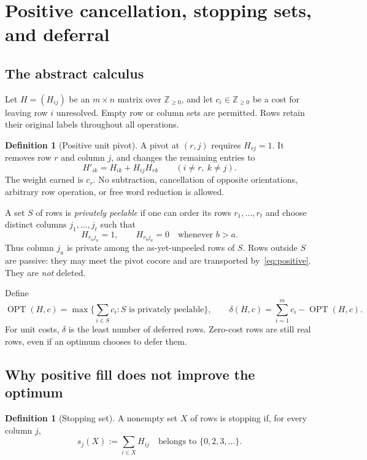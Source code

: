 \documentclass[11pt,a4paper]{article}
\theoremstyle{definition}
\newtheorem{definition}[theorem]{Definition}
\theoremstyle{remark}
\newcommand{\OPT}{\operatorname{OPT}}
\newcommand{\Z}{\mathbb Z}
\begin{document}
\section{Positive cancellation, stopping sets, and deferral}
\label{sec:positive}

\subsection{The abstract calculus}
Let $H=(H_{ij})$ be an $m\times n$ matrix over $\Z_{\geq0}$, and let
$c_i\in\Z_{\geq0}$ be a cost for leaving row $i$ unresolved. Empty row or
column sets are permitted. Rows retain their original labels throughout
all operations.

\begin{definition}[Positive unit pivot]
A pivot at $(r,j)$ requires $H_{rj}=1$. It removes row $r$ and column $j$,
and changes the remaining entries to
\begin{equation}
 H'_{ik}=H_{ik}+H_{ij}H_{rk}\qquad (i\ne r,\ k\ne j).
 \label{eq:positive}
\end{equation}
The weight earned is $c_r$. No subtraction, cancellation of opposite
orientations, arbitrary row operation, or free word reduction is allowed.
\end{definition}

A set $S$ of rows is \emph{privately peelable} if one can order its rows
$r_1,\ldots,r_t$ and choose distinct columns $j_1,\ldots,j_t$ such that
\begin{equation}
 H_{r_a j_a}=1,\qquad
 H_{r_b j_a}=0\quad\text{whenever }b>a.
 \label{eq:private}
\end{equation}
Thus column $j_a$ is private among the as-yet-unpeeled rows of $S$.
Rows outside $S$ are passive: they may meet the pivot cocore and are
transported by~\eqref{eq:positive}. They are \emph{not} deleted.

Define
\[
 \OPT(H,c)=\max\Big\{\sum_{i\in S}c_i:S\text{ is privately peelable}\Big\},
 \qquad
 \delta(H,c)=\sum_{i=1}^m c_i-\OPT(H,c).
\]
For unit costs, $\delta$ is the least number of deferred rows. Zero-cost
rows are still real rows, even if an optimum chooses to defer them.

\subsection{Why positive fill does not improve the optimum}
\begin{definition}[Stopping set]
A nonempty set $X$ of rows is stopping if, for every column $j$,
\[
 s_j(X):=\sum_{i\in X} H_{ij}\quad\text{belongs to }\{0,2,3,\ldots\}.
\]
\end{definition}
\end{document}
